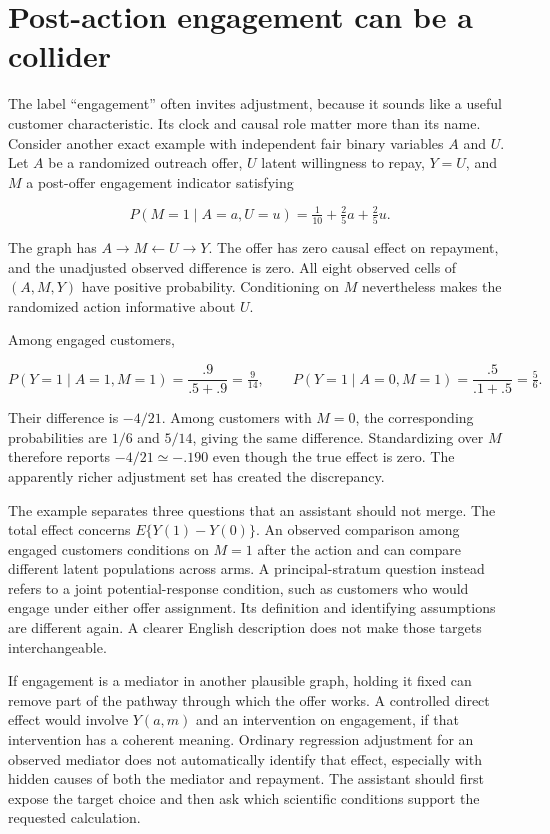 \hypertarget{post-action-engagement-can-be-a-collider}{%
\section{Post-action engagement can be a
collider}\label{post-action-engagement-can-be-a-collider}}

The label ``engagement'' often invites adjustment, because it sounds
like a useful customer characteristic. Its clock and causal role matter
more than its name. Consider another exact example with independent fair
binary variables \(A\) and \(U\). Let \(A\) be a randomized outreach
offer, \(U\) latent willingness to repay, \(Y=U\), and \(M\) a
post-offer engagement indicator satisfying

\[
 P(M=1\mid A=a,U=u)=\tfrac1{10}+\tfrac25a+\tfrac25u.
\]

The graph has \(A\to M\leftarrow U\to Y\). The offer has zero causal
effect on repayment, and the unadjusted observed difference is zero. All
eight observed cells of \((A,M,Y)\) have positive probability.
Conditioning on \(M\) nevertheless makes the randomized action
informative about \(U\).

Among engaged customers,

\[
 P(Y=1\mid A=1,M=1)=\frac{.9}{.5+.9}=\tfrac9{14},
 \qquad
 P(Y=1\mid A=0,M=1)=\frac{.5}{.1+.5}=\tfrac56.
\]

Their difference is \(-4/21\). Among customers with \(M=0\), the
corresponding probabilities are \(1/6\) and \(5/14\), giving the same
difference. Standardizing over \(M\) therefore reports
\(-4/21\simeq-.190\) even though the true effect is zero. The apparently
richer adjustment set has created the discrepancy.
\citep{exec13_diagram_examples}

The example separates three questions that an assistant should not
merge. The total effect concerns \(E\{Y(1)-Y(0)\}\). An observed
comparison among engaged customers conditions on \(M=1\) after the
action and can compare different latent populations across arms. A
principal-stratum question instead refers to a joint potential-response
condition, such as customers who would engage under either offer
assignment. Its definition and identifying assumptions are different
again. A clearer English description does not make those targets
interchangeable.

If engagement is a mediator in another plausible graph, holding it fixed
can remove part of the pathway through which the offer works. A
controlled direct effect would involve \(Y(a,m)\) and an intervention on
engagement, if that intervention has a coherent meaning. Ordinary
regression adjustment for an observed mediator does not automatically
identify that effect, especially with hidden causes of both the mediator
and repayment. The assistant should first expose the target choice and
then ask which scientific conditions support the requested calculation.


